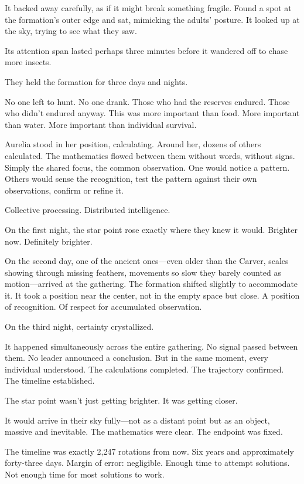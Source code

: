 It backed away carefully, as if it might break something fragile. Found a spot at the formation's outer edge and sat, mimicking the adults' posture. It looked up at the sky, trying to see what they saw.

Its attention span lasted perhaps three minutes before it wandered off to chase more insects.

\scenebreak

They held the formation for three days and nights.

No one left to hunt. No one drank. Those who had the reserves endured. Those who didn't endured anyway. This was more important than food. More important than water. More important than individual survival.

Aurelia stood in her position, calculating. Around her, dozens of others calculated. The mathematics flowed between them without words, without signs. Simply the shared focus, the common observation. One would notice a pattern. Others would sense the recognition, test the pattern against their own observations, confirm or refine it.

Collective processing. Distributed intelligence.

On the first night, the star point rose exactly where they knew it would. Brighter now. Definitely brighter.

On the second day, one of the ancient ones—even older than the Carver, scales showing through missing feathers, movements so slow they barely counted as motion—arrived at the gathering. The formation shifted slightly to accommodate it. It took a position near the center, not in the empty space but close. A position of recognition. Of respect for accumulated observation.

On the third night, certainty crystallized.

It happened simultaneously across the entire gathering. No signal passed between them. No leader announced a conclusion. But in the same moment, every individual understood. The calculations completed. The trajectory confirmed. The timeline established.

The star point wasn't just getting brighter. It was getting closer.

It would arrive in their sky fully—not as a distant point but as an object, massive and inevitable. The mathematics were clear. The endpoint was fixed.

The timeline was exactly 2,247 rotations from now. Six years and approximately forty-three days. Margin of error: negligible. Enough time to attempt solutions. Not enough time for most solutions to work.

